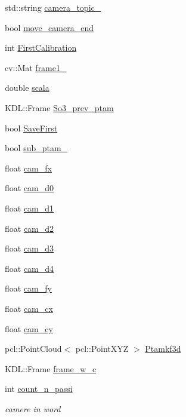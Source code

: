\begin{DoxyCompactItemize}
std\-::string \hyperlink{classCamera_a26a17808f034cbf22c913542695a957e}{camera\-\_\-topic\-\_\-}
\item 
bool \hyperlink{classCamera_a5e294d376163c3c4be7bd7154c03220e}{move\-\_\-camera\-\_\-end}
\item 
int \hyperlink{classCamera_aef0310393843e3bb2692dab6155b69a9}{First\-Calibration}
\item 
cv\-::\-Mat \hyperlink{classCamera_abffda8a107264c8b9a751d2271309347}{frame1\-\_\-}
\item 
double \hyperlink{classCamera_a724680ff9b6d9941710e45006d7c3654}{scala}
\item 
K\-D\-L\-::\-Frame \hyperlink{classCamera_afeaeb3e97cc648f250da792c08efd97d}{So3\-\_\-prev\-\_\-ptam}
\item 
bool \hyperlink{classCamera_ab64f4cee999ddfe78d5da5378bcf7e55}{Save\-First}
\item 
bool \hyperlink{classCamera_a95c8cb7d543f8a1c4ba50c1c82ce6f82}{sub\-\_\-ptam\-\_}
\item 
float \hyperlink{classCamera_a85fb4fdca2ce631f887be13d0f258387}{cam\-\_\-fx}
\item 
float \hyperlink{classCamera_a083cada78af8082bbbc6007771cd50b3}{cam\-\_\-d0}
\item 
float \hyperlink{classCamera_a510b6f07637b601621eb9a087087250a}{cam\-\_\-d1}
\item 
float \hyperlink{classCamera_a3c56197691507f2117c8c51843270145}{cam\-\_\-d2}
\item 
float \hyperlink{classCamera_aa3dac72dbb0af237246670a99c6b0d35}{cam\-\_\-d3}
\item 
float \hyperlink{classCamera_a848d4b20dd5eb94643102155c0c1bc77}{cam\-\_\-d4}
\item 
float \hyperlink{classCamera_a2ce9b1e50b825fecb0926ab8597981f5}{cam\-\_\-fy}
\item 
float \hyperlink{classCamera_a11d3e628c9fdc64a5c20661296976177}{cam\-\_\-cx}
\item 
float \hyperlink{classCamera_aa90c06105f326518304bb8b3f4790339}{cam\-\_\-cy}
\item 
pcl\-::\-Point\-Cloud$<$ pcl\-::\-Point\-X\-Y\-Z $>$ \hyperlink{classCamera_aef0d78eacbae15e72cb30d59083f3e03}{Ptamkf3d}
\item 
K\-D\-L\-::\-Frame \hyperlink{classCamera_a752d2cd26036e89172ac9eee430f083c}{frame\-\_\-w\-\_\-c}
\item 
int \hyperlink{classCamera_a6ff6974cfb1d7aa649cdcb9d97f6be8a}{count\-\_\-n\-\_\-passi}
\begin{DoxyCompactList}\small\item\em camere in word \end{DoxyCompactList}\end{DoxyCompactItemize}
